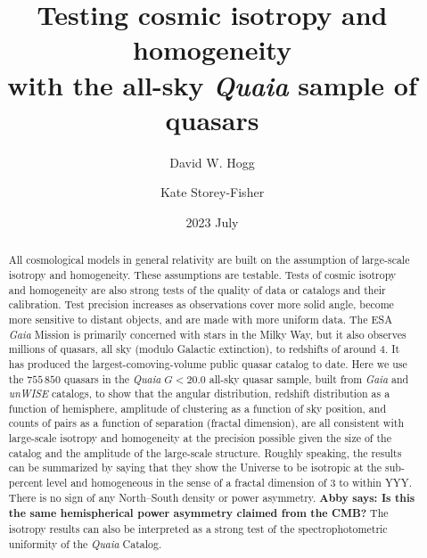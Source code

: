 \documentclass[modern]{aastex631}
\newcommand{\abby}[1]{\textbf{Abby says: #1}}
\begin{document}
\title{\large%
Testing cosmic isotropy and homogeneity \\ with the all-sky \textsl{Quaia} sample of quasars}
\author[0000-0003-2866-9403]{David W. Hogg}

\author[0000-0001-8764-7103]{Kate Storey-Fisher}

\date{2023 July}

\begin{abstract}\noindent
All cosmological models in general relativity are built on the assumption of large-scale isotropy and homogeneity.
These assumptions are testable.
Tests of cosmic isotropy and homogeneity are also strong tests of the quality of data or catalogs and their calibration.
Test precision increases as observations cover more solid angle, become more sensitive to distant objects, and are made with more uniform data.
The ESA \textsl{Gaia} Mission is primarily concerned with stars in the Milky Way, but it also observes millions of quasars, all sky (modulo Galactic extinction), to redshifts of around $4$.
It has produced the largest-comoving-volume public quasar catalog to date.
Here we use the $755\,850$ quasars in the \textsl{Quaia} $G<20.0$ all-sky quasar sample, built from \textsl{Gaia} and \textsl{unWISE} catalogs, to show that the angular distribution, redshift distribution as a function of hemisphere, amplitude of clustering as a function of sky position, and counts of pairs as a function of separation (fractal dimension), are all consistent with large-scale isotropy and homogeneity at the precision possible given the size of the catalog and the amplitude of the large-scale structure.
Roughly speaking, the results can be summarized by saying that they show the Universe to be isotropic at the sub-percent level and homogeneous in the sense of a fractal dimension of 3 to within YYY.
There is no sign of any North--South density or power asymmetry.
\abby{Is this the same hemispherical power asymmetry claimed from the CMB?}
The isotropy results can also be interpreted as a strong test of the spectrophotometric uniformity of the \textsl{Quaia} Catalog.
\end{abstract}

\end{document}
